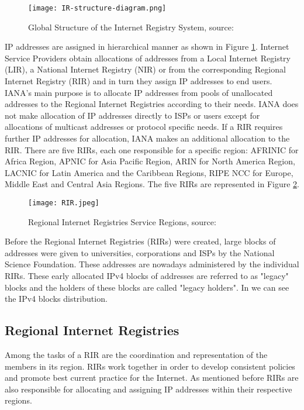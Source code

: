 \documentclass[11pt,a4paper]{scrreprt}
\begin{document}
\begin{figure}[!h]
\centering
\texttt{[image: IR-structure-diagram.png]}
\caption{Global Structure of the Internet Registry System, source:\cite{FIG_GLOBAL_IRS}}
\label{fig:ir_structure_diagram}
\end{figure}

IP addresses are assigned in hierarchical manner as shown in Figure \ref{fig:ir_structure_diagram}. Internet Service Providers obtain allocations of addresses from a Local Internet Registry (LIR), a National Internet Registry (NIR) or from the corresponding Regional Internet Registry (RIR) and in turn they assign IP addresses to end users. IANA's main purpose is to allocate IP addresses from pools of unallocated addresses to the Regional Internet Registries according to their needs. IANA does not make allocation of IP addresses directly to ISPs or users except for allocations of multicast addresses or protocol specific needs. If a RIR requires further IP addresses for allocation, IANA makes an additional allocation to the RIR. There are five RIRs, each one responsible for a specific region: AFRINIC for Africa Region, APNIC for Asia Pacific Region, ARIN for North America Region, LACNIC for Latin America and the Caribbean Regions, RIPE NCC for Europe, Middle East and Central Asia Regions. The five RIRs are represented in Figure \ref{fig:rirs_image}.

\begin{figure}[!h]
\centering
\texttt{[image: RIR.jpeg]}
\caption{Regional Internet Registries Service Regions, source:\cite{FIG_GLOBAL_IRS}}
\label{fig:rirs_image}
\end{figure}

Before the Regional Internet Registries (RIRs) were created, large blocks of addresses were given to universities, corporations and ISPs by the National Science Foundation. These addresses are nowadays administered by the individual RIRs. These early allocated IPv4 blocks of addresses are referred to as "legacy" blocks and the holders of these blocks are called "legacy holders". In \cite{IANA_Address_Space} we can see the IPv4 blocks distribution.


\subsection{Regional Internet Registries}


Among the tasks of a RIR are the coordination and representation of the members in its region. RIRs work together in order to develop consistent policies and promote best current practice for the Internet. As mentioned before RIRs are also responsible for allocating and assigning IP addresses within their respective regions. 
\end{document}
